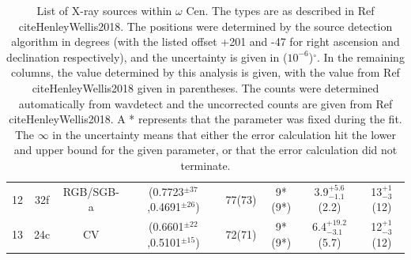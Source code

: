 \documentclass[aps,
                pra,  
                a4paper, 
                amsmath, 
                amssymb, 
                preprint,
                tightenlines,  
                amsfonts,
                nofootinbib,
                notitlepage
            ]{revtex4-2}
\begin{document}
\begin{center}
\begin{table}
\begin{tabular}{cccccccc}
        12 & 32f & RGB/SGB-a & (0.7723$^{\pm37}$,0.4691$^{\pm26}$) & 77(73) & 9*(9*) & 3.9$^{+5.6}_{-1.1}$(2.2) & 13$^{+1}_{-3}$(12)\\
        13 & 24c & CV & (0.6601$^{\pm22}$,0.5101$^{\pm15}$) & 72(71) & 9*(9*) & 6.4$^{+19.2}_{-3.1}$(5.7) & 12$^{+1}_{-3}$(12)\\
    \end{tabular}
    \caption{List of X-ray sources within $\omega$ Cen. The types are as described in Ref cite{HenleyWellis2018}. The positions were determined by the source detection algorithm in degrees (with the listed offset +201 and -47 for right ascension and declination respectively), and the uncertainty is given in ($10^{-6}$)$^\circ$. In the remaining columns, the value determined by this analysis is given, with the value from Ref cite{HenleyWellis2018} given in parentheses. The counts were determined automatically from {\sc wavdetect} and the uncorrected counts are given from Ref cite{HenleyWellis2018}. A * represents that the parameter was fixed during the fit. The $\infty$ in the uncertainty means that either the error calculation hit the lower and upper bound for the given parameter, or that the error calculation did not terminate.}
    \label{tab:fitting-results}
    \end{table}
\end{center}
\end{document}
